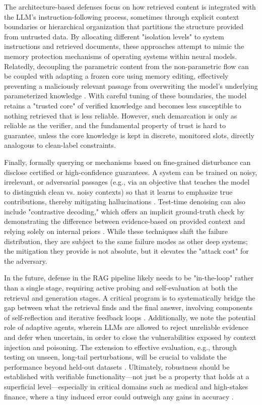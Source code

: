 \documentclass[11pt,a4paper]{article}
\begin{document}
The architecture-based defenses focus on how retrieved content is integrated with the LLM's instruction-following process, sometimes through explicit context boundaries or hierarchical organization that partitions the structure provided from untrusted data. By allocating different "isolation levels" to system instructions and retrieved documents, these approaches attempt to mimic the memory protection mechanisms of operating systems within neural models. Relatedly, decoupling the parametric content from the non-parametric flow can be coupled with adapting a frozen core using memory editing, effectively preventing a maliciously relevant passage from overwriting the model's underlying parameterized knowledge \cite{arxiv:2206.06520v1}. With careful tuning of these boundaries, the model retains a "trusted core" of verified knowledge and becomes less susceptible to nothing retrieved that is less reliable. However, such demarcation is only as reliable as the verifier, and the fundamental property of trust is hard to guarantee, unless the core knowledge is kept in discrete, monitored slots, directly analogous to clean-label constraints.

Finally, formally querying or mechanisms based on fine-grained disturbance can disclose certified or high-confidence guarantees. A system can be trained on noisy, irrelevant, or adversarial passages (e.g., via an objective that teaches the model to distinguish clean vs. noisy contexts) so that it learns to emphasize true contributions, thereby mitigating hallucinations \cite{arxiv:2401.01313v3}. Test-time denoising can also include "contrastive decoding," which offers an implicit ground-truth check by demonstrating the difference between evidence-based on provided context and relying solely on internal priors \cite{arxiv:2405.02750v1}. While these techniques shift the failure distribution, they are subject to the same failure modes as other deep systems; the mitigation they provide is not absolute, but it elevates the "attack cost" for the adversary.

In the future, defense in the RAG pipeline likely needs to be "in-the-loop" rather than a single stage, requiring active probing and self-evaluation at both the retrieval and generation stages. A critical program is to systematically bridge the gap between what the retrieval finds and the final answer, involving components of self-reflection and iterative feedback loops \cite{arxiv:2212.10511v4}. Additionally, we note the potential role of adaptive agents, wherein LLMs are allowed to reject unreliable evidence and defer when uncertain, in order to close the vulnerabilities exposed by context injection and poisoning. The extension to effective evaluation, e.g., through testing on unseen, long-tail perturbations, will be crucial to validate the performance beyond held-out datasets \cite{arxiv:2312.10997v5}. Ultimately, robustness should be established with verifiable functionality---not just be a property that holds at a superficial level---especially in critical domains such as medical and high-stakes finance, where a tiny induced error could outweigh any gains in accuracy \cite{arxiv:2312.10997v5}.
\end{document}
